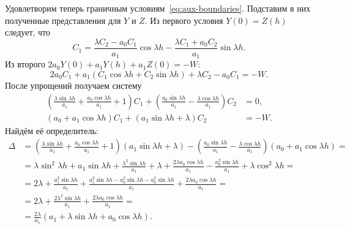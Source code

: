 \documentclass[a4paper,14pt]{article}
\begin{document}
Удовлетворим теперь граничным условиям~\eqref{eq:aux-boundaries}.
Подставим в них полученные представления для $Y$ и $Z$. Из
первого условия $Y(0) = Z(h)$ следует, что
\begin{equation*}
  C_1
  =
  \frac{\lambda C_2 - a_0 C_1}{a_1}
  \cos \lambda h
  -
  \frac{\lambda C_1 + a_0 C_2}{a_1}
  \sin \lambda h.
\end{equation*}
Из второго $2 a_0 Y(0) + a_1 Y(h) + a_1 Z(0) = -W$:
\begin{equation*}
  2 a_0 C_1
  + a_1 \left(
    C_1 \cos \lambda h + C_2 \sin \lambda h
  \right)
  + \lambda C_2 - a_0 C_1 = -W.
\end{equation*}
После упрощений получаем систему
\begin{equation*}
  \begin{aligned}
    \left(
    \frac{\lambda \sin \lambda h}{a_1}
    + \frac{a_0 \cos \lambda h}{a_1}
    + 1
    \right)
    C_1
    +
    \left(
    \frac{a_0 \sin \lambda h}{a_1}
    - \frac{\lambda \cos \lambda h}{a_1}
    \right)
    C_2
    &= 0, \\
    \left(
    a_0 + a_1 \cos \lambda h
    \right)
    C_1
    +
    \left(
    a_1 \sin \lambda h + \lambda
    \right)
    C_2
    &=
      -W.
  \end{aligned}
\end{equation*}
Найдём её определитель:
\begin{equation*}
  \begin{aligned}
    \Delta
    &=
      \left(
      \frac{\lambda \sin \lambda h}{a_1}
      + \frac{a_0 \cos \lambda h}{a_1}
      + 1
      \right)
      \left(
      a_1 \sin \lambda h + \lambda
      \right)
      -
      \left(
      \frac{a_0 \sin \lambda h}{a_1}
      - \frac{\lambda \cos \lambda h}{a_1}
      \right)
      \left(
      a_0 + a_1 \cos \lambda h
      \right)
      = \\
    &=
      \lambda \sin^2 \lambda h + a_1 \sin \lambda h
      + \frac{\lambda^2 \sin \lambda h}{a_1} + \lambda
      + \frac{2 \lambda a_0 \cos \lambda h}{a_1}
      - \frac{a_0^2 \sin \lambda h}{a_1}
      + \lambda \cos^2 \lambda h = \\
    &=
      2 \lambda
      + \frac{a_1^2 \sin \lambda h}{a_1}
      + \frac{
      a_1^2 \sin \lambda h - a_0^2 \sin \lambda h
      - a_0^2 \sin \lambda h
      }{a_1}
      + \frac{2 \lambda a_0 \cos \lambda h}{a_1} = \\
    &=
      2 \lambda
      + \frac{2 \lambda^2 \sin \lambda h}{a_1}
      + \frac{2 \lambda a_0 \cos \lambda h}{a_1} = \\
    &=
      \frac{2 \lambda}{a_1} \left(
      a_1 + \lambda \sin \lambda h + a_0 \cos \lambda h
      \right).
  \end{aligned}
\end{equation*}
\end{document}
